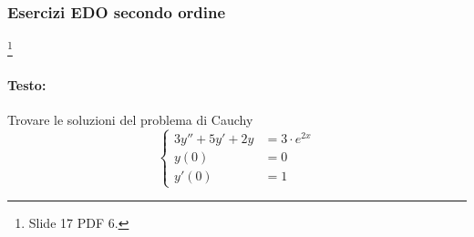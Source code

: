 \subsubsection{Esercizi EDO secondo ordine}
\begin{example}\footnote{Slide 17 PDF 6.}
	\paragraph{Testo:} Trovare le soluzioni del problema di Cauchy
	\begin{equation*}
		\begin{cases}
			3 y'' + 5 y' + 2 y &= 3\cdot e^{2x}\\
			y(0) &= 0\\
			y'(0) &= 1
		\end{cases}
	\end{equation*}

\end{example}
